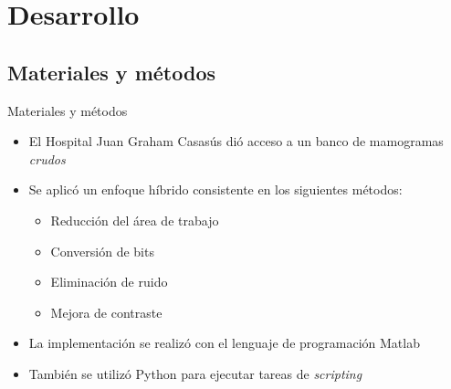 \documentclass{beamer}
\begin{document}
\section{Desarrollo}
\subsection{Materiales y métodos}
\begin{frame}{Materiales y métodos}
\transdissolve
  \pause
  \begin{itemize}[<+-| alert@+>]
    \item El Hospital Juan Graham Casasús dió acceso a un banco de mamogramas \textit{crudos}
    \item Se aplicó un enfoque híbrido consistente en los siguientes métodos:
    \begin{itemize}[<+-| alert@+>]
        \item Reducción del área de trabajo
        \item Conversión de bits
        \item Eliminación de ruido
        \item Mejora de contraste
    \end{itemize}
    \item La implementación se realizó con el lenguaje de programación Matlab
    \item También se utilizó Python para ejecutar tareas de \textit{scripting}
  \end{itemize}
\end{frame}
\end{document}
